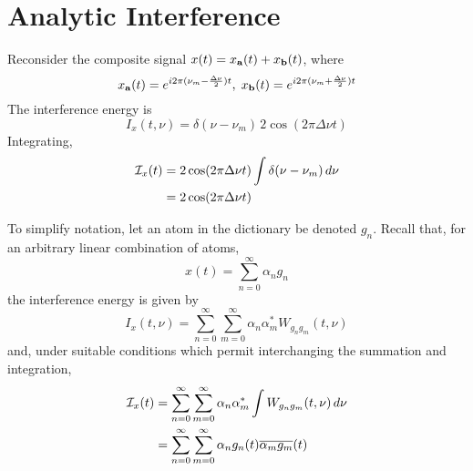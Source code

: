 \section{Analytic Interference}
\label{sec:analytic}
Reconsider the composite signal $x(t) = x_{\mathbf{a}}(t) + x_{\mathbf{b}}(t)$, where
\[
x_{\mathbf{a}}(t)
      =e^{i2\pi(\nu_m-{\scriptstyle \frac{\Delta\nu}{2}})t},\;
x_{\mathbf{b}}(t)
      = e^{i2\pi(\nu_m+{\scriptstyle \frac{\Delta\nu}{2}})t}
\]
The interference energy is %
\[
I_x(t,\nu) = \delta(\nu-\nu_m)\,2\cos(2\pi \Delta\nu t)
\]
Integrating,
\begin{align*}
\mathcal{I}_x(t)   &= 2\cos(2\pi \Delta\nu t) \int \delta(\nu-\nu_m)\,d\nu\\
           &= 2\cos(2\pi \Delta\nu t)
\end{align*}

To simplify notation, let an atom in the dictionary be  denoted $g_n$.
Recall that, for an arbitrary linear combination of atoms, 
\[
x(t) = \sum_{n=0}^\infty \alpha_n g_n
\]
the interference energy is given by 
\[
I_x(t,\nu) = \sum_{n=0}^\infty \sum_{m=0}^\infty \alpha_n\alpha_m^*W_{g_ng_m}(t,\nu)
\]
and, under suitable conditions which permit interchanging the summation and integration,
\begin{align*}
\mathcal{I}_x(t) &= \sum_{n=0}^\infty \sum_{m=0}^\infty \alpha_n\alpha_m^*\int W_{g_ng_m}(t,\nu) \, d\nu\\
&= \sum_{n=0}^\infty \sum_{m=0}^\infty \alpha_ng_n(t)\overline{\alpha_m g_m}(t)
\end{align*}
